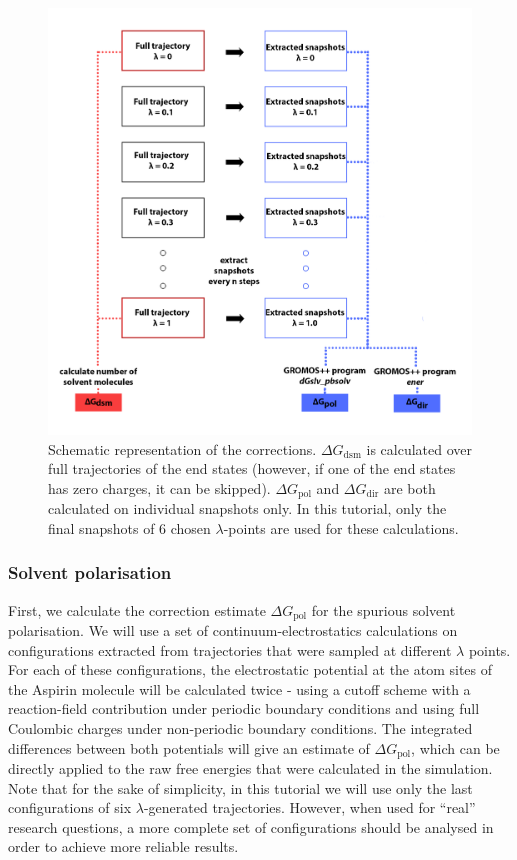 \begin{figure}[H]
    \centering
    \includegraphics[scale=0.14]{../05_tutorial_02/figures/general_application_corrections.png}
    \caption{Schematic representation of the corrections. $\Delta G_{\text{dsm}}$ is
      calculated over full trajectories of the end states (however, if one of the end states has zero charges, it can be skipped). $\Delta G_{\text{pol}}$ and $\Delta G_{\text{dir}}$ are both calculated on individual snapshots
      only. In this tutorial, only the final snapshots of 6 chosen $\lambda$-points are used for these calculations.}
    \label{fig:correction_scheme}
\end{figure}


\subsubsection{Solvent polarisation}
First, we calculate the correction estimate $\Delta G_{\text{pol}}$ for the
spurious solvent polarisation. We will use a set of
continuum-electrostatics calculations on configurations extracted from
trajectories that were sampled at different $\lambda$ points. For each of
these configurations, the electrostatic potential at the atom sites of the
Aspirin molecule will be calculated twice - using a cutoff scheme with
a reaction-field contribution under periodic boundary conditions and
using full Coulombic charges under non-periodic boundary
conditions. The integrated differences between both
potentials will give an estimate of $\Delta G_{\text{pol}}$, which can be directly
applied to the raw free energies that were calculated in the
simulation. Note that for the sake of simplicity, in this tutorial we
will use only the last configurations of six $\lambda$-generated
trajectories. However, when used for ``real'' research questions, a
more complete set of configurations should be analysed in order to achieve
more reliable results.

